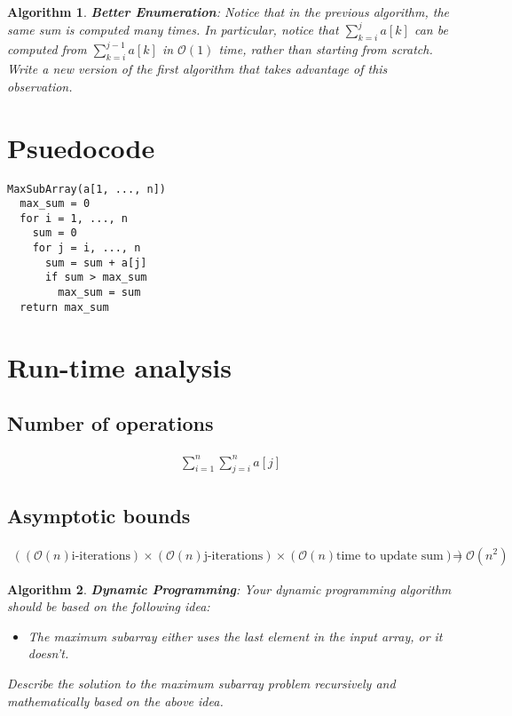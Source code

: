 \documentclass{article}
\newtheorem{algorithm}{Algorithm}
\begin{document}
\begin{algorithm}
\textbf{Better Enumeration}: Notice that in the previous algorithm,  the
same sum is computed many times.  In particular, notice that
$\sum_{k=i}^{j}a[k]$ can be computed from $\sum_{k=i}^{j-1}a[k]$ in
$\mathcal{O}(1)$ time, rather than starting from scratch. Write a new version
of the first algorithm that takes advantage of this observation.
\end{algorithm}

\section*{Psuedocode}

\begin{verbatim}
MaxSubArray(a[1, ..., n])
  max_sum = 0
  for i = 1, ..., n
    sum = 0
    for j = i, ..., n
      sum = sum + a[j]
      if sum > max_sum
        max_sum = sum
  return max_sum
\end{verbatim}

\section*{Run-time analysis}

\subsection*{Number of operations}
\begin{eqnarray*}
  \sum_{i=1}^{n}\sum_{j=i}^{n}a[j]
\end{eqnarray*}

\subsection*{Asymptotic bounds}
\begin{eqnarray*}
    ((\mathcal{O}(n) \text{i-iterations}) \times
    (\mathcal{O}(n) \text{j-iterations}) \times
    (\mathcal{O}(n) \text{time to update sum}) ) = \mathcal{O}(n^2)
\end{eqnarray*}


\begin{algorithm}
\textbf{Dynamic Programming}: Your dynamic programming algorithm should be
based on the following idea:

\begin{itemize}
\item The maximum subarray either uses the last element in the input array,
or it doesn't.
\end{itemize}

Describe the solution to the maximum subarray problem recursively and
mathematically based on the above idea.
\end{algorithm}
\end{document}

